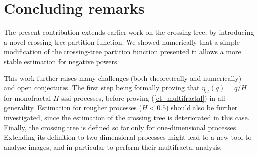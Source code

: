 \documentclass[a4paper]{article}
\begin{document}
\section{Concluding remarks}
\label{ssec:numwork}

The present contribution extends earlier work on the crossing-tree, by introducing a novel crossing-tree partition function. 
We showed numerically that a simple modification of the crossing-tree partition function presented in \cite{DecrAJ13, DecrA15} allows a more stable estimation for negative powers.

This work further raises many challenges (both theoretically and numerically) and open conjectures.
The first step being formally proving that $\eta_{ct}(q)=q/H$ for monofractal $H$-sssi processes, before proving (\ref{ct_multifractal}) in all generality.
Estimation for rougher processes ($H<0.5$) should also be further investigated, since the estimation of the crossing tree is deteriorated in this case. 
Finally, the crossing tree is defined so far only for one-dimensional processes. 
Extending its definition to two-dimensional processes might lead to a new tool to analyse images, and in particular to perform their multifractal analysis. 




\end{document}
